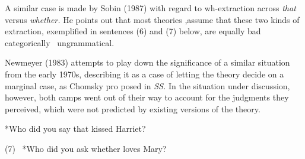 \begin{styleStandard}
A similar case is made by Sobin (1987) with regard to wh-extraction across \textit{that}\textit{ }versus \textit{whether.}\textit{ }He points out that most theories ,assume that these two kinds of extraction, exemplified in sentences (6) and (7) below, are equally bad\- categorically \ ungrammatical.
\end{styleStandard}


\setcounter{listWWNumlxleveli}{14}
\begin{listWWNumlxleveli}
\item 
\begin{styleStandard}
Newmeyer (1983) attempts to play down the significance of a similar situation from the early 1970s, describing it as a case of {\textquotedbl}letting the theory decide{\textquotedbl} on a marginal case, as Chomsky pro\- posed in \textit{SS.}\textit{ }In the situation under discussion, however, both camps went out of their way to account for the judgments they perceived, which were not predicted by existing versions of the theory.
\end{styleStandard}


\end{listWWNumlxleveli}
\clearpage\setcounter{page}{1}\begin{multicols}{2}
\setcounter{listWWNumlxileveli}{3}
\begin{listWWNumlxileveli}
\item 
\begin{styleTextbody}
*Who did you say that kissed Harriet?
\end{styleTextbody}


\end{listWWNumlxileveli}
\begin{styleTextbody}
(7) \ *Who did you ask whether loves Mary?
\end{styleTextbody}


\begin{styleStandard}
[= Sobin{\textquotesingle}s (l)]
\end{styleStandard}


\begin{styleTextbody}
[= Sobin{\textquotesingle}s (4)]
\end{styleTextbody}


\end{multicols}
